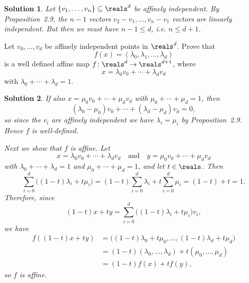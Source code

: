 \documentclass[article, a4paper, 11pt, oneside]{memoir}
\numberwithin{equation}{chapter}
\theoremstyle{nonumberplain}
\newtheorem{solution}{Solution}
\begin{document}
\begin{solution}
    Let $\{v_1, \ldots, v_n\} \subseteq \reals^d$ be affinely independent. By Proposition~2.9, the $n-1$ vectors $v_2 - v_1, \ldots, v_n - v_1$ vectors are linearly independent. But then we must have $n-1 \leq d$, i.e. $n \leq d+1$.
\end{solution}


\begin{exerciseframed*}[11]
    Let $v_0, \ldots, v_d$ be affinely independent points in $\reals^d$. Prove that
    \begin{equation*}
        f(x) = (\lambda_0, \lambda_1, \ldots, \lambda_d)
    \end{equation*}
    is a well defined affine map $f \colon \reals^d \to \reals^{d+1}$, where
    \begin{equation*}
        x = \lambda_0 v_0 + \cdots + \lambda_d v_d
    \end{equation*}
    with $\lambda_0 + \cdots + \lambda_d = 1$.
\end{exerciseframed*}

\begin{solution}
    If also $x = \mu_0 v_0 + \cdots + \mu_d v_d$ with $\mu_0 + \cdots + \mu_d = 1$, then
    \begin{equation*}
        (\lambda_0 - \mu_0) v_0 + \cdots + (\lambda_d - \mu_d) v_d
            = 0,
    \end{equation*}
    so since the $v_i$ are affinely independent we have $\lambda_i = \mu_i$ by Proposition~2.9. Hence $f$ is well-defined.

    Next we show that $f$ is affine. Let
    \begin{equation*}
        x = \lambda_0 v_0 + \cdots + \lambda_d v_d
        \quad \text{and} \quad
        y = \mu_0 v_0 + \cdots + \mu_d v_d
    \end{equation*}
    with $\lambda_0 + \cdots + \lambda_d = 1$ and $\mu_0 + \cdots + \mu_d = 1$, and let $t \in \reals$. Then
    \begin{equation*}
        \sum_{i=0}^d \bigl( (1-t)\lambda_i + t\mu_i \bigr)
            = (1-t) \sum_{i=0}^d\lambda_i + t \sum_{i=0}^d\mu_i
            = (1-t) + t
            = 1.
    \end{equation*}
    Therefore, since
    \begin{equation*}
        (1-t)x + ty
            = \sum_{i=0}^d \bigl( (1-t)\lambda_i + t\mu_i \bigr) v_i,
    \end{equation*}
    we have
    \begin{align*}
        f((1-t)x + ty)
            &= \bigl( (1-t)\lambda_0 + t\mu_0, \ldots, (1-t)\lambda_d + t\mu_d \bigr) \\
            &= (1-t)(\lambda_0, \ldots, \lambda_d) + t(\mu_0, \ldots, \mu_d) \\
            &= (1-t)f(x) + tf(y),
    \end{align*}
    so $f$ is affine.
\end{solution}
\end{document}
